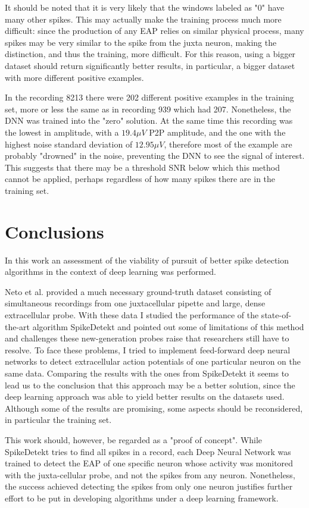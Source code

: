 \documentclass[10pt]{article}
\begin{document}
It should be noted that it is very likely that the windows labeled as "0" have many other spikes. This may actually make the training process much more difficult: since the production of any EAP relies on similar physical process, many spikes may be very similar to the spike from the juxta neuron, making the distinction, and thus the training, more difficult. For this reason, using a bigger dataset should return significantly better results, in particular, a bigger dataset with more different positive examples.

In the recording 8213 there were 202 different positive examples in the training set, more or less the same as in recording 939 which had 207. Nonetheless, the DNN was trained into the "zero" solution. At the same time this recording was the lowest in amplitude, with a $19.4 \mu V$ P2P amplitude, and the one with the highest noise standard deviation of $12.95 \mu V$, therefore most of the example are probably "drowned" in the noise, preventing the DNN to see the signal of interest. This suggests that there may be a threshold SNR below which this method cannot be applied, perhaps regardless of how many spikes there are in the training set.


\section{Conclusions}
In this work an assessment of the viability of pursuit of better spike detection algorithms in the context of deep learning was performed. 

Neto et al. provided a much necessary ground-truth dataset consisting of simultaneous recordings from one juxtacellular pipette and large, dense extracellular probe. With these data I studied the performance of the state-of-the-art algorithm SpikeDetekt and pointed out some of limitations of this method and challenges these new-generation probes raise that researchers still have to resolve. To face these problems, I tried to implement feed-forward deep neural networks to detect extracellular action potentials of one particular neuron on the same data. Comparing the results with the ones from SpikeDetekt it seems to lead us to the conclusion that this approach may be a better solution, since the deep learning approach was able to yield better results on the datasets used. Although some of the results are promising, some aspects should be reconsidered, in particular the training set. 

This work should, however, be regarded as a "proof of concept". While SpikeDetekt tries to find all spikes in a record, each Deep Neural Network was trained to detect the EAP of one specific neuron whose activity was monitored with the juxta-cellular probe, and not the spikes from any neuron. Nonetheless, the success achieved detecting the spikes from only one neuron justifies further effort to be put in developing algorithms under a deep learning framework.


\end{document}
